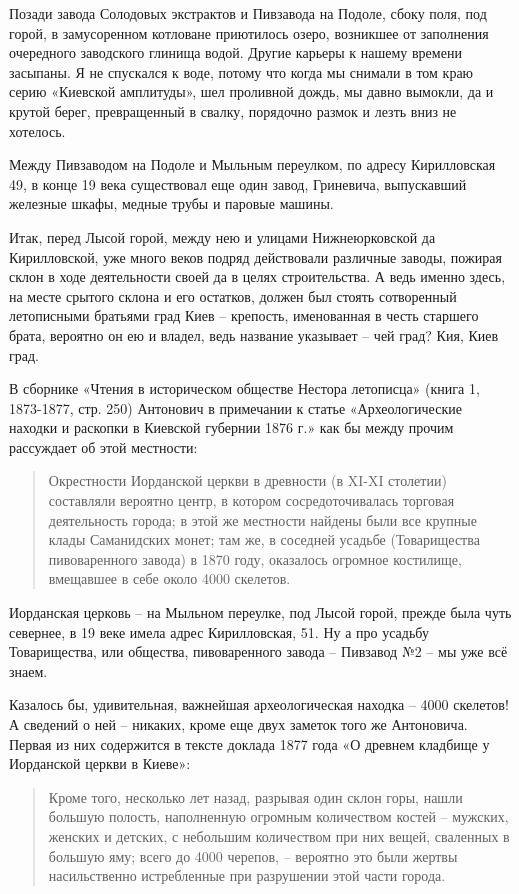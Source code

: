 Позади завода Солодовых экстрактов и Пивзавода на Подоле, сбоку поля, под горой, в замусоренном котловане приютилось озеро, возникшее от заполнения очередного заводского глинища водой. Другие карьеры к нашему времени засыпаны. Я не спускался к воде, потому что когда мы снимали в том краю серию «Киевской амплитуды», шел проливной дождь, мы давно вымокли, да и крутой берег, превращенный в свалку, порядочно размок и лезть вниз не хотелось.

Между Пивзаводом на Подоле и Мыльным переулком, по адресу Кирилловская 49, в конце 19 века существовал еще один завод, Гриневича, выпускавший железные шкафы, медные трубы и паровые машины.

Итак, перед Лысой горой, между нею и улицами Нижнеюрковской да Кирилловской, уже много веков подряд действовали различные заводы, пожирая склон в ходе деятельности своей да в целях строительства. А ведь именно здесь, на месте срытого склона и его остатков, должен был стоять сотворенный летописными братьями град Киев – крепость, именованная в честь старшего брата, вероятно он ею и владел, ведь название указывает – чей град? Кия, Киев град. 

В сборнике «Чтения в историческом обществе Нестора летописца» (книга 1, 1873-1877, стр. 250) Антонович в примечании к статье «Археологические находки и раскопки в Киевской губернии 1876 г.» как бы между прочим рассуждает об этой местности:

\begin{quotation}
Окрестности Иорданской церкви в древности (в XI-XI столетии) составляли вероятно центр, в котором сосредоточивалась торговая деятельность города; в этой же местности найдены были все крупные клады Саманидских монет; там же, в соседней усадьбе (Товарищества пивоваренного завода) в 1870 году, оказалось огромное костилище, вмещавшее в себе около 4000 скелетов.
\end{quotation}

Иорданская церковь – на Мыльном переулке, под Лысой горой, прежде была чуть севернее, в 19 веке имела адрес Кирилловская, 51. Ну а про усадьбу Товарищества, или общества, пивоваренного завода – Пивзавод №2 – мы уже всё знаем.

Казалось бы, удивительная, важнейшая археологическая находка – 4000 скелетов! А сведений о ней – никаких, кроме еще двух заметок того же Антоновича. Первая из них содержится в тексте доклада 1877 года «О древнем кладбище у Иорданской церкви в Киеве»:

\begin{quotation}
Кроме того, несколько лет назад, разрывая один склон горы, нашли большую полость, наполненную огромным количеством костей – мужских, женских и детских, с небольшим количеством при них вещей, сваленных в большую яму; всего до 4000 черепов, – вероятно это были жертвы насильственно истребленные при разрушении этой части города.
\end{quotation}

